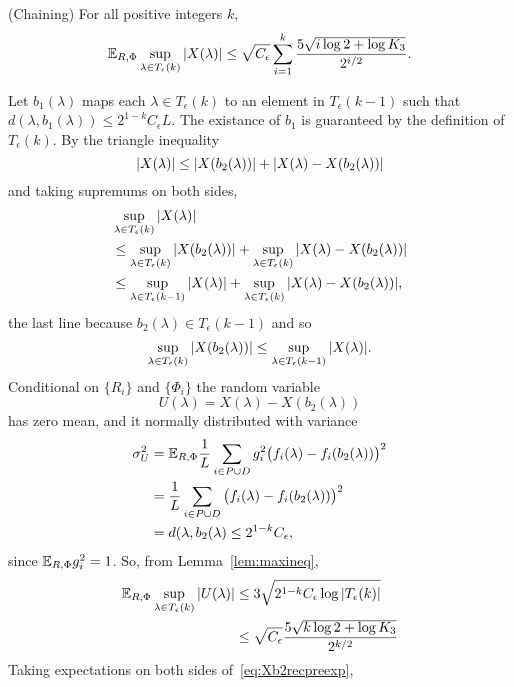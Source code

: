 \documentclass[journal]{IEEEtran}
\begin{document}
\begin{lemma}\label{lem:chaining3}(Chaining)
For all positive integers $k$,
\[
{\mathbb E}_{R,\Phi} \sup_{\lambda \in T_\epsilon(k) } {\left\vert  X(\lambda)  \right\vert} \leq \sqrt{C_\epsilon} \sum_{i=1}^k \frac{5\sqrt{i \log 2 + \log K_3}}{2^{i/2}}.
\]
\end{lemma}
\begin{IEEEproof}
Let $b_1(\lambda)$ maps each $\lambda \in T_\epsilon(k)$ to an element in $T_\epsilon(k-1)$ such that $d(\lambda, b_1(\lambda)) \leq 2^{1-k}C_\epsilon L$.  The existance of $b_1$ is guaranteed by the definition of $T_\epsilon(k)$.  By the triangle inequality
\[
{\vert X(\lambda) \vert} \leq {\vert X(b_2(\lambda)) \vert} + {\vert X(\lambda) - X(b_2(\lambda)) \vert}  
\]
and taking supremums on both sides,
\begin{align}
&\sup_{\lambda \in T_\epsilon(k)}{\vert X(\lambda) \vert} \nonumber \\
&\leq \sup_{\lambda \in T_\epsilon(k)}{\vert X(b_2(\lambda)) \vert} + \sup_{\lambda \in T_\epsilon(k)} {\vert X(\lambda) - X(b_2(\lambda)) \vert}   \nonumber \\
&\leq \sup_{\lambda \in T_\epsilon(k-1)}{\vert X(\lambda) \vert} + \sup_{\lambda \in T_\epsilon(k)} {\vert X(\lambda) - X(b_2(\lambda)) \vert}, \label{eq:Xb2recpreexp}
\end{align}
the last line because $b_2(\lambda) \in T_\epsilon(k-1)$ and so
\[
\sup_{\lambda \in T_\epsilon(k)}{\vert X(b_2(\lambda)) \vert} \leq \sup_{\lambda \in T_\epsilon(k-1)}{\vert X(\lambda) \vert}.
\]
Conditional on $\{R_i\}$ and $\{\Phi_i\}$ the random variable
\[
U(\lambda) = X(\lambda) - X(b_2(\lambda))
\]
has zero mean, and it normally distributed with variance
\begin{align*}
\sigma_U^2 &= {\mathbb E}_{R,\Phi} \frac{1}{L} \sum_{i \in P \cup D} g_i^2 \big( f_i(\lambda) - f_i(b_2(\lambda)) \big)^2 \\
&=  \frac{1}{L} \sum_{i \in P \cup D} \big( f_i(\lambda) - f_i(b_2(\lambda)) \big)^2 \\
&= d(\lambda, b_2(\lambda) \leq 2^{1-k} C_\epsilon,
\end{align*}
since ${\mathbb E}_{R,\Phi}g_i^2 = 1$.  So, from Lemma~\ref{lem:maxineq},
\begin{align*}
{\mathbb E}_{R,\Phi} \sup_{\lambda \in T_\epsilon(k)} {\vert U(\lambda) \vert} &\leq 3 \sqrt{ 2^{1-k} C_\epsilon \log {\left\vert T_\epsilon(k) \right\vert} } \\
&\leq \sqrt{C_\epsilon} \frac{5\sqrt{k \log 2 + \log K_3}}{2^{k/2}}  
\end{align*}
Taking expectations on both sides of~\eqref{eq:Xb2recpreexp},

\end{IEEEproof}
\end{document}
